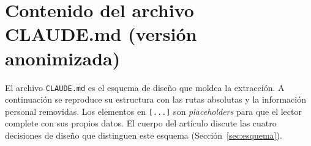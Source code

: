 \documentclass[12pt,a4paper]{article}
\begin{document}
\printbibliography[title={Referencias}]


\appendix

\section{Contenido del archivo CLAUDE.md (versión anonimizada)}
\label{anx:claude-md}

El archivo \texttt{CLAUDE.md} es el esquema de diseño que moldea la extracción.
A continuación se reproduce su estructura con las rutas absolutas y la
información personal removidas. Los elementos en \texttt{[...]} son
\emph{placeholders} para que el lector complete con sus propios datos. El cuerpo
del artículo discute las cuatro decisiones de diseño que distinguen este esquema
(Sección~\ref{sec:esquema}).
\end{document}
